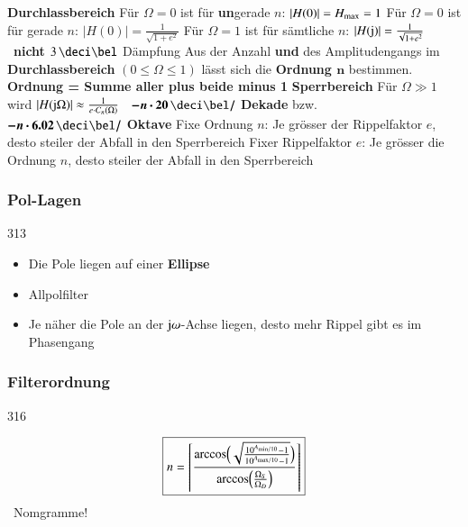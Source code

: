 \begin{outline}
    \1 \textbf{Durchlassbereich}
        \2 Für $\Omega = 0$ ist für \textbf{un}gerade $n$: $|H(0)| = H_{\rm max} = 1$
        \2 Für $\Omega = 0$ ist für gerade $n$: $|H(0)| = \frac{1}{\sqrt{1 + e^2}}$
        \2 Für $\Omega = 1$ ist für sämtliche $n$: $|H(\mathrm{j})| = \frac{1}{\sqrt{1 + e^2}}$ 
            \textrightarrow\ \textbf{nicht} $3 \, \deci \bel$ Dämpfung
        \2 Aus der Anzahl \textbf{ und } des Amplitudengangs im \textbf{Durchlassbereich} 
            $(0 \leq \Omega \leq 1)$ lässt sich die \textbf{Ordnung $\bm{n}$} bestimmen. \\
            \textbf{Ordnung = Summe aller  plus beide   minus 1}
    \1 \textbf{Sperrbereich}
        \2 Für $\Omega \gg 1$ wird $|H(\mathrm{j} \Omega)| \approx \frac{1}{e \cdot C_n(\Omega)}$ 
            \textrightarrow\ $\bm{- n \cdot 20 \, \deci \bel /}$ \textbf{Dekade} bzw.\\
            $\bm{- n \cdot 6.02 \, \deci \bel /}$ \textbf{Oktave}
        \2 Fixe Ordnung $n$: Je grösser der Rippelfaktor $e$, desto steiler der Abfall in den Sperrbereich
        \2 Fixer Rippelfaktor $e$: Je grösser die Ordnung $n$, desto steiler der Abfall in den Sperrbereich
\end{outline}


\begin{minipage}[t]{0.48\columnwidth}
    \subsubsection{Pol-Lagen}{313}

    \begin{itemize}
        \item Die Pole liegen auf einer \textbf{Ellipse}
        \item Allpolfilter
        \item Je näher die Pole an der $\mathrm{j} \omega$-Achse liegen, desto mehr Rippel gibt es im Phasengang %
    \end{itemize}
\end{minipage}
\hfill
\begin{minipage}[t]{0.48\columnwidth}
    \subsubsection{Filterordnung}{316}

    $$ \boxed{ n =  \left\lceil \frac{\arccos \Bigl( \sqrt{ \frac{10^{A_{\rm min / 10}} - 1}{10^{A_{\rm max / 10}} - 1} } \Bigr) }
        {\arccos \Bigl( \frac{\Omega_S}{\Omega_D} \Bigr)}  \right\rceil } $$
    \textrightarrow\ Nomgramme!
\end{minipage}


